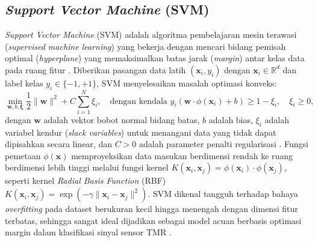 \subsection{\textit{Support Vector Machine} (SVM)}
\textit{Support Vector Machine} (SVM) adalah algoritma pembelajaran mesin terawasi (\textit{supervised machine learning}) yang bekerja dengan mencari bidang pemisah optimal (\textit{hyperplane}) yang memaksimalkan batas jarak (\textit{margin}) antar kelas data pada ruang fitur \cite{cortes1995support}. Diberikan pasangan data latih $(\mathbf{x}_i, y_i)$ dengan $\mathbf{x}_i \in \mathbb{R}^d$ dan label kelas $y_i \in \{-1, +1\}$, SVM menyelesaikan masalah optimasi konveks:
\begin{equation}
\min_{\mathbf{w}, b, \boldsymbol{\xi}} \frac{1}{2} \|\mathbf{w}\|^2 + C \sum_{i=1}^{N} \xi_i, \quad \text{dengan kendala } y_i (\mathbf{w} \cdot \phi(\mathbf{x}_i) + b) \ge 1 - \xi_i, \quad \xi_i \ge 0,
\end{equation}
dengan $\mathbf{w}$ adalah vektor bobot normal bidang batas, $b$ adalah bias, $\xi_i$ adalah variabel kendur (\textit{slack variables}) untuk menangani data yang tidak dapat dipisahkan secara linear, dan $C > 0$ adalah parameter penalti regularisasi \cite{cortes1995support}. Fungsi pemetaan $\phi(\mathbf{x})$ memproyeksikan data masukan berdimensi rendah ke ruang berdimensi lebih tinggi melalui fungsi kernel $K(\mathbf{x}_i, \mathbf{x}_j) = \phi(\mathbf{x}_i) \cdot \phi(\mathbf{x}_j)$, seperti kernel \textit{Radial Basis Function} (RBF) $K(\mathbf{x}_i, \mathbf{x}_j) = \exp(-\gamma \|\mathbf{x}_i - \mathbf{x}_j\|^2)$. SVM dikenal tangguh terhadap bahaya \textit{overfitting} pada dataset berukuran kecil hingga menengah dengan dimensi fitur terbatas, sehingga sangat ideal dijadikan sebagai model acuan berbasis optimasi margin dalam klasifikasi sinyal sensor TMR \cite{cortes1995support}.


